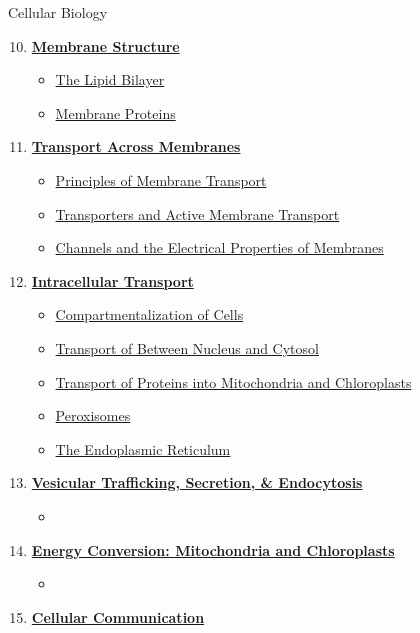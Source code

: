 \documentclass[12pt,letterpaper]{article}
\begin{document}
\begin{contbox}{Cellular Biology}{ 
\begin{enumerate}[font=\bfseries, wide]
    \setcounter{enumi}{9}
    \item \hyperlink{10}{\textbf{Membrane Structure}}
    \begin{itemize}
        \item \hyperlink{10.1a}{The Lipid Bilayer}
        \item \hyperlink{10.2a}{Membrane Proteins}
    \end{itemize}
    \item \hyperlink{11}{\textbf{Transport Across Membranes}}
    \begin{itemize}
        \item \hyperlink{11.1}{Principles of Membrane Transport}
        \item \hyperlink{11.2}{Transporters and Active Membrane Transport}
        \item \hyperlink{11.3}{Channels and the Electrical Properties of Membranes}
    \end{itemize}
    \item \hyperlink{12}{\textbf{Intracellular Transport}}
    \begin{itemize}
        \item \hyperlink{12.1}{Compartmentalization of Cells}
        \item \hyperlink{12.2}{Transport of Between Nucleus and Cytosol}
        \item \hyperlink{12.3}{Transport of Proteins into Mitochondria and Chloroplasts}
        \item \hyperlink{12.4}{Peroxisomes}
        \item \hyperlink{12.5}{The Endoplasmic Reticulum}
    \end{itemize}
    \item \hyperlink{13}{\textbf{Vesicular Trafficking, Secretion, \& Endocytosis}}
    \begin{itemize}
        \item
    \end{itemize}
    \item \hyperlink{14}{\textbf{Energy Conversion: Mitochondria and Chloroplasts}}
    \begin{itemize}
        \item 
    \end{itemize}
    \item \hyperlink{15}{\textbf{Cellular Communication}}
    \begin{itemize}

\end{itemize}
\end{enumerate}}
\end{contbox}
\end{document}
